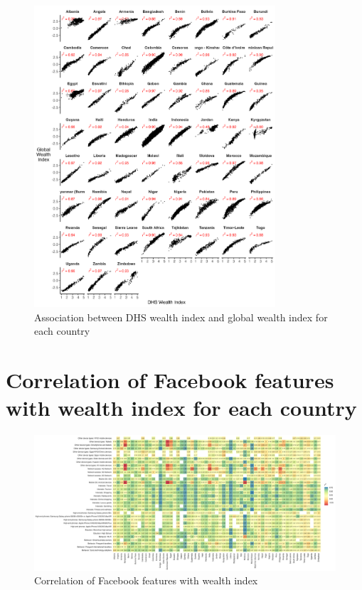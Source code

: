 \documentclass{article}
\begin{document}
\begin{figure}[H]
    \centering
    \includegraphics[width=0.8\textwidth]{figures/dhsindex_globalindex_cor.png}
    \caption{Association between DHS wealth index and global wealth index for each country}
     \label{fig:dhsindex_globalindex_cor}
\end{figure}

\newpage
\section{Correlation of Facebook features with wealth index for each country}
\label{si:cor_fb_wi}

\begin{figure}[H]
    \centering
    \includegraphics[width=1\textwidth]{figures/fb_features_cor_each_country.png}
    \caption{Correlation of Facebook features with wealth index}
     \label{fig:fb_features_cor_each_country}
\end{figure}
\end{document}

